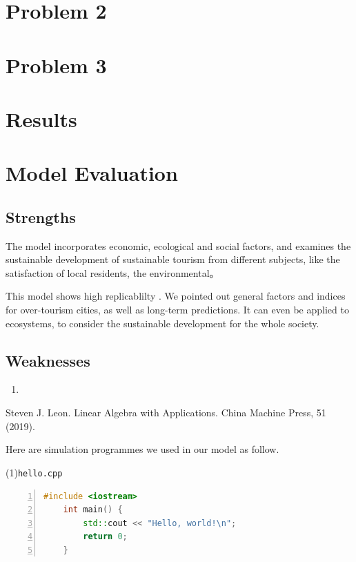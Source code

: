 \documentclass[UTF8]{mcmthesis}
\begin{document}
    \section{Problem 2}
    \section{Problem 3}
    \section{Results}
    \section{Model Evaluation}
        \subsection{Strengths}

\item The model incorporates economic, ecological and social factors, and examines the  sustainable development of sustainable tourism from different subjects, like the satisfaction of local residents, the environmental。
																																																																																				
\item This model shows high replicablilty . We pointed out general factors and indices for over-tourism cities, as well as long-term predictions. It can even be applied to ecosystems, to consider the sustainable development for the whole society.

            
        \subsection{Weaknesses}
            \begin{enumerate}
                \item 
            \end{enumerate}


        \begin{thebibliography}{99}
            Steven J. Leon.
            Linear Algebra with Applications.
            China Machine Press, 51 (2019).
        \end{thebibliography}


    \begin{appendices}
        Here are simulation programmes we used in our model as follow.
        
        \vspace{.5em}
        \noindent(1)\quad \verb|hello.cpp|
        \vspace{.5em}
        \begin{lstlisting}[language = c++, numbers = left]
    #include <iostream>
    int main() {
        std::cout << "Hello, world!\n";
        return 0;
    }
        \end{lstlisting}

    \end{appendices}
\end{document}

